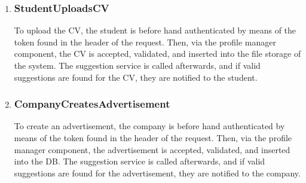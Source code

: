 \begin{enumerate}[label=\textbf{RV\arabic* -}]
\item \subsubsection{StudentUploadsCV}

To upload the CV, the student is before hand authenticated by means of the token found in the header of the request.
Then, via the profile manager component, the CV is accepted, validated, and inserted into the file storage of the system.
The suggestion service is called afterwards, and if valid suggestions are found for the CV, they are notified to the student.

\begin{figure}[H]
    \centering
\end{figure}

\item \subsubsection{CompanyCreatesAdvertisement}

To create an advertisement, the company is before hand authenticated by means of the token found in the header of the request.
Then, via the profile manager component, the advertisement is accepted, validated, and inserted into the DB.
The suggestion service is called afterwards, and if valid suggestions are found for the advertisement, they are notified to the company.

\begin{figure}[H]
    \centering
\end{figure}


\end{enumerate}
